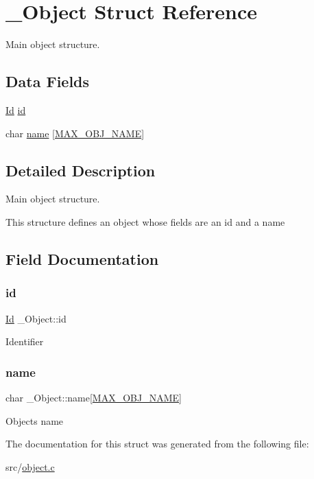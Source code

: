 \hypertarget{struct__Object}{}\section{\+\_\+\+Object Struct Reference}
\label{struct__Object}


Main object structure.  


\subsection*{Data Fields}
\begin{DoxyCompactItemize}
\item 
\hyperlink{types_8h_a845e604fb28f7e3d97549da3448149d3}{Id} \hyperlink{struct__Object_a3cff7a0e8dc4e9d23895ed9af1b7653a}{id}
\item 
char \hyperlink{struct__Object_a59556463a256cec309077768589f10a8}{name} \mbox{[}\hyperlink{object_8h_a6a2f391825e94d06a3137b75abfa1bba}{M\+A\+X\+\_\+\+O\+B\+J\+\_\+\+N\+A\+ME}\mbox{]}
\end{DoxyCompactItemize}


\subsection{Detailed Description}
Main object structure. 

This structure defines an object whose fields are an id and a name 

\subsection{Field Documentation}
\mbox{\label{struct__Object_a3cff7a0e8dc4e9d23895ed9af1b7653a}} 
\subsubsection{\texorpdfstring{id}{id}}
{\footnotesize\ttfamily \hyperlink{types_8h_a845e604fb28f7e3d97549da3448149d3}{Id} \+\_\+\+Object\+::id}

Identifier \mbox{\label{struct__Object_a59556463a256cec309077768589f10a8}} 
\subsubsection{\texorpdfstring{name}{name}}
{\footnotesize\ttfamily char \+\_\+\+Object\+::name\mbox{[}\hyperlink{object_8h_a6a2f391825e94d06a3137b75abfa1bba}{M\+A\+X\+\_\+\+O\+B\+J\+\_\+\+N\+A\+ME}\mbox{]}}

Object\textquotesingle{}s name 

The documentation for this struct was generated from the following file\+:\begin{DoxyCompactItemize}
\item 
src/\hyperlink{object_8c}{object.\+c}\end{DoxyCompactItemize}
